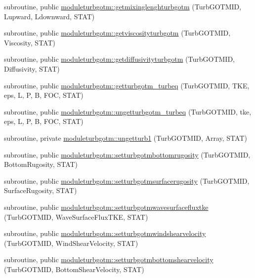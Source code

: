 \begin{DoxyCompactItemize}
\item 
subroutine, public \mbox{\hyperlink{namespacemoduleturbgotm_a6d3261fc0b6cba6819262e7f8ce2b140}{moduleturbgotm\+::getmixinglenghturbgotm}} (Turb\+G\+O\+T\+M\+ID, Lupward, Ldownward, S\+T\+AT)
\item 
subroutine, public \mbox{\hyperlink{namespacemoduleturbgotm_a96d85a3644e939450eb599e84624f5b3}{moduleturbgotm\+::getviscosityturbgotm}} (Turb\+G\+O\+T\+M\+ID, Viscosity, S\+T\+AT)
\item 
subroutine, public \mbox{\hyperlink{namespacemoduleturbgotm_a44eb11a0b54701f863dfae9be213de0e}{moduleturbgotm\+::getdiffusivityturbgotm}} (Turb\+G\+O\+T\+M\+ID, Diffusivity, S\+T\+AT)
\item 
subroutine, public \mbox{\hyperlink{namespacemoduleturbgotm_a087db16b86a3a5c9670ca783b6075e65}{moduleturbgotm\+::getturbgotm\+\_\+turbeq}} (Turb\+G\+O\+T\+M\+ID, T\+KE, eps, L, P, B, F\+OC, S\+T\+AT)
\item 
subroutine, public \mbox{\hyperlink{namespacemoduleturbgotm_a4858630313fbbb17b65257d59f9e67ca}{moduleturbgotm\+::ungetturbgotm\+\_\+turbeq}} (Turb\+G\+O\+T\+M\+ID, tke, eps, L, P, B, F\+OC, S\+T\+AT)
\item 
subroutine, private \mbox{\hyperlink{namespacemoduleturbgotm_ab21e7a83e00f82db5a1c214bd784426a}{moduleturbgotm\+::ungetturb1}} (Turb\+G\+O\+T\+M\+ID, Array, S\+T\+AT)
\item 
subroutine, public \mbox{\hyperlink{namespacemoduleturbgotm_a2596446f2aa54a9db3ed26b9552952d6}{moduleturbgotm\+::setturbgotmbottomrugosity}} (Turb\+G\+O\+T\+M\+ID, Bottom\+Rugosity, S\+T\+AT)
\item 
subroutine, public \mbox{\hyperlink{namespacemoduleturbgotm_ac71371400c754c4786f6914ccc6d6c70}{moduleturbgotm\+::setturbgotmsurfacerugosity}} (Turb\+G\+O\+T\+M\+ID, Surface\+Rugosity, S\+T\+AT)
\item 
subroutine, public \mbox{\hyperlink{namespacemoduleturbgotm_a868b912c54f8467afdf5608913e56f87}{moduleturbgotm\+::setturbgotmwavesurfacefluxtke}} (Turb\+G\+O\+T\+M\+ID, Wave\+Surface\+Flux\+T\+KE, S\+T\+AT)
\item 
subroutine, public \mbox{\hyperlink{namespacemoduleturbgotm_acbaf0e58ab0ad4a29aca5101ed59bdea}{moduleturbgotm\+::setturbgotmwindshearvelocity}} (Turb\+G\+O\+T\+M\+ID, Wind\+Shear\+Velocity, S\+T\+AT)
\item 
subroutine, public \mbox{\hyperlink{namespacemoduleturbgotm_a9e719059bf7bff5946e65a3d8157ada6}{moduleturbgotm\+::setturbgotmbottomshearvelocity}} (Turb\+G\+O\+T\+M\+ID, Bottom\+Shear\+Velocity, S\+T\+AT)

\end{DoxyCompactItemize}

